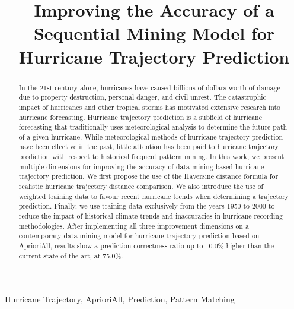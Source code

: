 \documentclass[12pt,conference]{IEEEtran}
\begin{document}
\raggedbottom

\title{Improving the Accuracy of a Sequential Mining Model for Hurricane Trajectory Prediction}

\author{
}

\maketitle
\begin{abstract}

In the 21st century alone, hurricanes have caused billions of dollars worth of damage due to property destruction, personal danger, and civil unrest. The catastrophic impact of hurricanes and other tropical storms has motivated extensive research into hurricane forecasting. Hurricane trajectory prediction is a subfield of hurricane forecasting that traditionally uses meteorological analysis to determine the future path of a given hurricane. While meteorological methods of hurricane trajectory prediction have been effective in the past, little attention has been paid to hurricane trajectory prediction with respect to historical frequent pattern mining. In this work, we present multiple dimensions for improving the accuracy of data mining-based hurricane trajectory prediction. We first propose the use of the Haversine distance formula for realistic hurricane trajectory distance comparison. We also introduce the use of weighted training data to favour recent hurricane trends when determining a trajectory prediction. Finally, we use training data exclusively from the years 1950 to 2000 to reduce the impact of historical climate trends and inaccuracies in hurricane recording methodologies. After implementing all three improvement dimensions on a contemporary data mining model for hurricane trajectory prediction based on AprioriAll, results show a prediction-correctness ratio up to 10.0\% higher than the current state-of-the-art, at 75.0\%.

\end{abstract}

\begin{IEEEkeywords}
Hurricane Trajectory, AprioriAll, Prediction, Pattern Matching
\end{IEEEkeywords}
\end{document}
